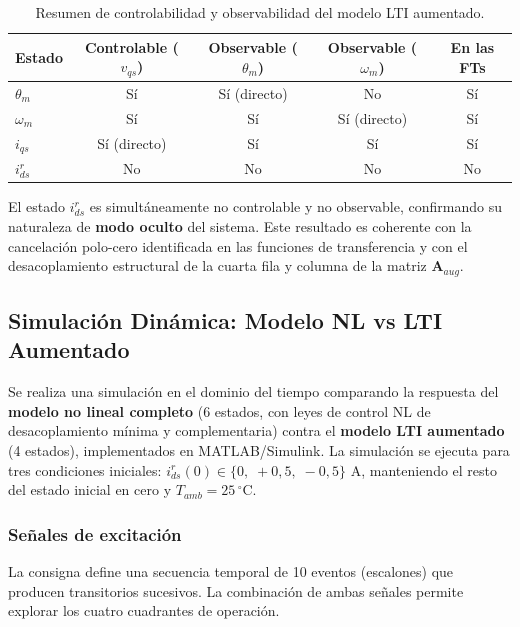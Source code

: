 \documentclass[12pt, a4paper,journal, onecolumn, compsoc]{IEEEtran}
\begin{document}
\begin{table}[H]
\centering
\caption{Resumen de controlabilidad y observabilidad del modelo LTI aumentado.}
\label{tab:ctrl_obs}
\renewcommand{\arraystretch}{1.3}
\begin{tabular}{|l|c|c|c|c|}
\hline
\textbf{Estado} & \textbf{Controlable} ($v_{qs}$) & \textbf{Observable} ($\theta_m$) & \textbf{Observable} ($\omega_m$) & \textbf{En las FTs} \\
\hline
$\theta_m$   & Sí & Sí (directo) & No & Sí \\
$\omega_m$   & Sí & Sí           & Sí (directo) & Sí \\
$i_{qs}$     & Sí (directo) & Sí      & Sí & Sí \\
$i_{ds}^r$   & No & No            & No & No \\
\hline
\end{tabular}
\end{table}

El estado $i_{ds}^r$ es simultáneamente no controlable y no observable, confirmando su naturaleza de \textbf{modo oculto} del sistema. Este resultado es coherente con la cancelación polo-cero identificada en las funciones de transferencia y con el desacoplamiento estructural de la cuarta fila y columna de la matriz $\mathbf{A}_{aug}$.

\subsection{Simulación Dinámica: Modelo NL vs LTI Aumentado}
\label{sec:sim_dinamica}

Se realiza una simulación en el dominio del tiempo comparando la respuesta del \textbf{modelo no lineal completo} (6 estados, con leyes de control NL de desacoplamiento mínima y complementaria) contra el \textbf{modelo LTI aumentado} (4 estados), implementados en MATLAB/Simulink. La simulación se ejecuta para tres condiciones iniciales: $i_{ds}^r(0) \in \{0,\; +0{,}5,\; -0{,}5\}$ A, manteniendo el resto del estado inicial en cero y $T_{amb} = 25\,^\circ$C.

\subsubsection{Señales de excitación}

La consigna define una secuencia temporal de 10 eventos (escalones) que producen transitorios sucesivos. La combinación de ambas señales permite explorar los cuatro cuadrantes de operación.
\end{document}
